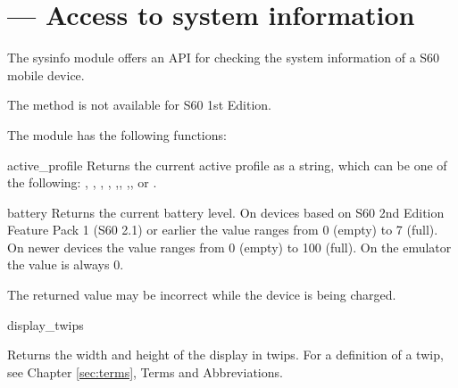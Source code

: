 %
%
%

\section{ ---
    Access to system information}
\label{sec:sysinfo}
The \textsf{sysinfo} module offers an API for checking the system 
information of a S60 mobile device. 

\begin{notice}[note]
The method  is not available for S60 1st Edition.
\end{notice}

The  module has the following functions:

\begin{funcdesc}{active_profile}{}
Returns the current active profile as a string, which can be one of the 
following: , , , 
, ,, ,, 
or .
\end{funcdesc}

\begin{funcdesc}{battery}{}
Returns the current battery level. On devices based on S60 2nd Edition
Feature Pack 1 (S60 2.1) or earlier the value ranges from 0 (empty) to
7 (full). On newer devices the value ranges from 0 (empty) to 100
(full). On the emulator the value is always 0. 
\begin{notice}[note] 
The returned value may be incorrect while the device is being charged.
\end{notice}

\end{funcdesc}


\begin{funcdesc}{display_twips}{}

Returns the width and height of the display in twips. For a definition of a 
twip, see Chapter \ref{sec:terms}, Terms and Abbreviations. 

\end{funcdesc}

